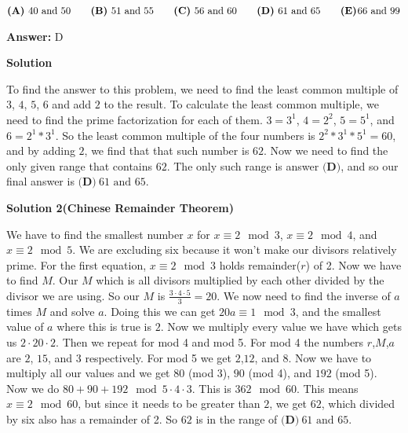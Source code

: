 \begin{enumerate}
 $\textbf{(A)}\hspace{.05in}40\text{ and }50\qquad\textbf{(B)}\hspace{.05in}51\text{ and }55\qquad\textbf{(C)}\hspace{.05in}56\text{ and }60\qquad\textbf{(D)}\hspace{.05in}\text{61 and 65}\qquad\textbf{(E)}\hspace{.01in}\text{66 and 99}$

 \textbf{Answer: }D



\textbf{Solution}

To find the answer to this problem, we need to find the least common multiple of $3$, $4$, $5$, $6$ and add $2$ to the result. To calculate the least common multiple, we need to find the prime factorization for each of them. $3 = 3^{1}$, $4 = 2^{2}$, $5 = 5^{1}$, and $6 = 2^{1}*{3^{1}}$. So the least common multiple of the four numbers is $2^{2}*{3^{1}*{5^{1}}} = 60$, and by adding $2$, we find that that such number is $62$. Now we need to find the only given range that contains $62$. The only such range is answer $\textbf{(D)}$, and so our final answer is $\boxed{\textbf{(D)}\ 61\text{ and }65}$.

 



\textbf{Solution 2(Chinese Remainder Theorem)}

We have to find the smallest number $x$ for $x \equiv 2\mod3$, $x \equiv 2\mod4$, and $x \equiv 2\mod5$. We are excluding six because it won't make our divisors relatively prime. For the first equation, $x \equiv 2\mod3$ holds remainder($r$) of 2. Now we have to find $M$. Our $M$ which is all divisors multiplied by each other divided by the divisor we are using. So our $M$ is $\frac{3 \cdot 4 \cdot 5}{3}=20$. We now need to find the inverse of $a$ times $M$ and solve $a$. Doing this we can get $20a \equiv 1\mod3$, and the smallest value of $a$ where this is true is $2$. Now we multiply every value we have which gets us $2 \cdot 20 \cdot 2$. Then we repeat for mod 4 and mod 5. For mod 4 the numbers $r$,$M$,$a$ are $2$, $15$, and $3$ respectively. For mod 5 we get $2$,$12$, and $8$. Now we have to multiply all our values and we get $80$ (mod 3), $90$ (mod 4), and $192$ (mod 5). Now we do $80+90+192\mod{5 \cdot 4 \cdot 3}$. This is $362\mod60$. This means $x \equiv 2\mod60$, but since it needs to be greater than $2$, we get $62$, which divided by six also has a remainder of 2. So $62$ is in the range of $\boxed{\textbf{(D)}\ 61\text{ and }65}$.


\end{enumerate}
